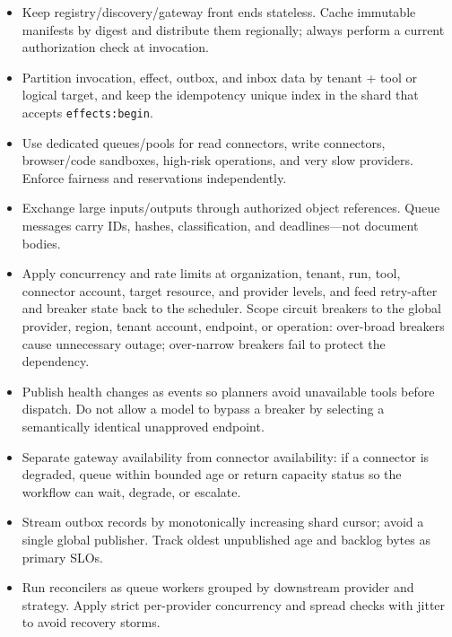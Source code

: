\begin{itemize}

\item Keep registry/discovery/gateway front ends stateless. Cache immutable manifests by digest and distribute them regionally; always perform a current authorization check at invocation.

\item Partition invocation, effect, outbox, and inbox data by tenant + tool or logical target, and keep the idempotency unique index in the shard that accepts \lstinline[style=bookinline]!effects:begin!.

\item Use dedicated queues/pools for read connectors, write connectors, browser/code sandboxes, high-risk operations, and very slow providers. Enforce fairness and reservations independently.

\item Exchange large inputs/outputs through authorized object references. Queue messages carry IDs, hashes, classification, and deadlines—not document bodies.

\item Apply concurrency and rate limits at organization, tenant, run, tool, connector account, target resource, and provider levels, and feed retry-after and breaker state back to the scheduler. Scope circuit breakers to the global provider, region, tenant account, endpoint, or operation: over-broad breakers cause unnecessary outage; over-narrow breakers fail to protect the dependency.

\item Publish health changes as events so planners avoid unavailable tools before dispatch. Do not allow a model to bypass a breaker by selecting a semantically identical unapproved endpoint.

\item Separate gateway availability from connector availability: if a connector is degraded, queue within bounded age or return capacity status so the workflow can wait, degrade, or escalate.

\item Stream outbox records by monotonically increasing shard cursor; avoid a single global publisher. Track oldest unpublished age and backlog bytes as primary SLOs.

\item Run reconcilers as queue workers grouped by downstream provider and strategy. Apply strict per-provider concurrency and spread checks with jitter to avoid recovery storms.


\end{itemize}
